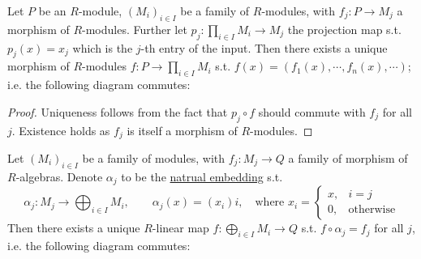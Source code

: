 \documentclass{article}
\begin{document}
\begin{theorem}\label{thm:Universal Property of Direct Product}
    Let $P$ be an $R$-module, $(M_i)_{i\in I}$ be a family of $R$-modules, with $f_j: P \to M_j$ a morphism of $R$-modules. Further let $p_j : \prod_{i\in I} M_i \to M_j$ the projection map s.t. $p_j(x) = x_j$ which is the $j$-th entry of the input. Then there exists a unique morphism of $R$-modules $f: P\to\prod_{i\in I} M_i$ s.t. $f(x) = (f_1(x), \cdots, f_n(x), \cdots)$; i.e. the following diagram commutes:
    \begin{figure}[htbp]
        \centering
    \end{figure}
\end{theorem}

\begin{proof}
    Uniqueness follows from the fact that $p_j\circ f$ should commute with $f_j$ for all $j$. Existence holds as $f_j$ is itself a morphism of $R$-modules.
\end{proof}

\begin{theorem}\label{thm:Universal Property of Direct Sum}
    Let $(M_i)_{i\in I}$ be a family of modules, with $f_j: M_j \to Q$ a family of morphism of $R$-algebras. Denote $\alpha_j$ to be the \underline{natrual embedding} s.t.
    \[
        \alpha_j: M_j  \to \bigoplus_{i\in I} M_i, \qquad \alpha_j(x) = (x_i)i, \quad\text{where } x_i = \begin{cases} x, & i = j \\ 0, & \text{otherwise} \end{cases}
    \]
    Then there exists a unique $R$-linear map $f: \bigoplus_{i\in I} M_i \to Q$ s.t. $f\circ \alpha_j = f_j$ for all $j$, i.e. the following diagram commutes:
    \begin{figure}[htbp]
        \centering
    \end{figure}
\end{theorem}
\end{document}
